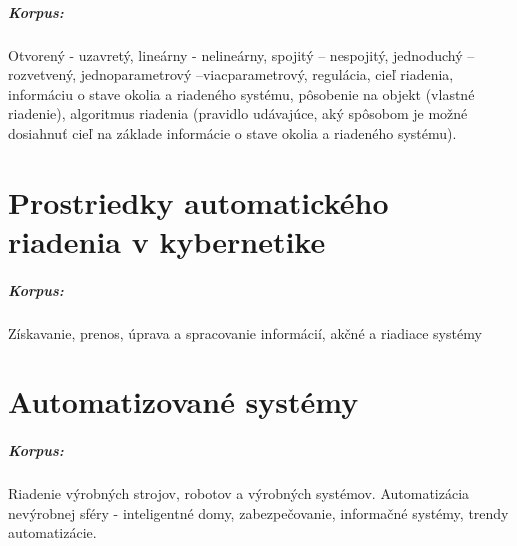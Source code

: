 \documentclass[11pt,a4paper]{report}
\begin{document}
\paragraph{Korpus:} Otvorený - uzavretý, lineárny - nelineárny, spojitý – nespojitý, jednoduchý – rozvetvený, jednoparametrový –viacparametrový, regulácia, cieľ riadenia, informáciu o stave okolia a riadeného systému, pôsobenie na objekt (vlastné riadenie), algoritmus riadenia (pravidlo udávajúce, aký spôsobom je možné dosiahnuť cieľ na základe informácie o stave okolia a riadeného systému).

\chapter{Prostriedky automatického riadenia v kybernetike}

\paragraph{Korpus:} Získavanie, prenos, úprava a spracovanie informácií, akčné a riadiace systémy

\chapter{Automatizované systémy}

\paragraph{Korpus:} Riadenie výrobných strojov, robotov a výrobných systémov. Automatizácia nevýrobnej sféry - inteligentné domy, zabezpečovanie, informačné systémy, trendy automatizácie. 
\end{document}
